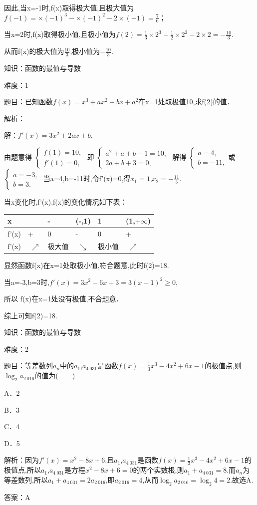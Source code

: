 \documentclass{article} %
\begin{document}
因此,当x=-1时,f(x)取得极大值,且极大值为$f(-1)=\times(-1)^{3}-\times(-1)^{2}-2\times(-1)=\frac{7}{6}$；

当x=2时,f(x)取得极小值,且极小值为$f(2)=\frac{1}{3}\times2^{3}-\frac{1}{2}\times2^{2}-2\times2=-\frac{10}{3}$.

从而f(x)的极大值为$\frac{10}{3}$,极小值为$-\frac{10}{3}$.



知识：函数的最值与导数

难度：1

题目：已知函数$f(x)=x^{3}+ax^{2}+bx+a^{2}$在x=1处取极值10,求f(2)的值．

解析：

解：$f'(x)=3x^{2}+2ax+b$.

由题意得
$
\begin{cases}
f(1)=10,\\
f'(1)=0,
\end{cases}$
即
$
\begin{cases}
a^2+a+b+1=10,\\
2a+b+3=0,
\end{cases}$
解得
$
\begin{cases}
a=4,\\
b=-11,
\end{cases}$或
$
\begin{cases}
a=-3,\\
b=3.
\end{cases}$
当a=4,b=-11时,令f'(x)=0,得$x_{1}=1$,$x_{2}=-\frac{11}{3}$.

当x变化时,f'(x),f(x)的变化情况如下表：



\begin{tabular}{|p{0.5in}|p{0.9in}|p{0.5in}|p{0.9in}|p{0.5in}|p{0.8in}|} \hline 
	x &  & - & (-,1) & 1 & (1,$+\infty$) \\ \hline 
	f'(x) & + & 0 & - & 0 & + \\ \hline 
	f'(x) & ${\nearrow}$ & 极大值 & ${\searrow}$ & 极小值 & ${\nearrow}$ \\ \hline 
\end{tabular}

显然函数f(x)在x=1处取极小值,符合题意,此时f(2)=18.

当a=-3,b=3时,$f'(x)=3x^{2}-6x+3=3(x-1)^{2}\ge0$,

所以 f(x)在x=1处没有极值,不合题意．

综上可知f(2)=18.



知识：函数的最值与导数

难度：2

题目：等差数列${a_{n}}$中的$a_{1}$,$a_{4\ 031}$是函数$f(x)=\frac{1}{3}x^{3}-4x^{2}+6x-1$的极值点,则$\log_{2}a_{2\ 016}$的值为(　　)

A．2　　　　

B．3　　　　

C．4　　　　

D．5

解析：因为$f'(x)=x^{2}-8x+6$,且$a_{1}$,$a_{4\ 031}$是函数$f(x)=\frac{1}{3}x^{3}-4x^{2}+6x-1$的极值点,所以$a_{1}$,$a_{4\ 031}$是方程$x^{2}-8x+6=0$的两个实数根,则$a_{1}+a_{4\ 031}=8$.而${a_{n}}$为等差数列,所以$a_{1}+a_{4\ 031}=2a_{2\ 016}$,即$a_{2\ 016}=4$,从而$\log_{2}a_{2\ 016}=\log_{2}4=2$.故选A.

答案：A
\end{document}
